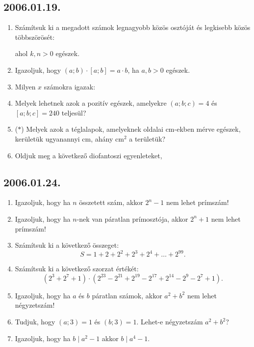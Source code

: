 \subsection*{2006.01.19.}
\begin{enumerate}
\item Számítsuk ki a megadott számok legnagyobb közös osztóját és legkisebb közös többszörösét:
ahol $k,n>0$ egészek.

\item Igazoljuk, hogy $(a;b) \cdot [a;b]=a \cdot b$, ha $a,b>0$ egészek.
\item Milyen $x$ számokra igazak:
\item Melyek lehetnek azok a pozitív egészek, amelyekre $(a;b;c)=4$ és $[a;b;c]=240$ teljesül?
\item ($*$) Melyek azok a téglalapok, amelyeknek oldalai cm-ekben mérve egészek, kerületük ugyanannyi cm, ahány cm$^2$ a területük?
\item Oldjuk meg a következő diofantoszi egyenleteket,
\end{enumerate}

\subsection*{2006.01.24.}
\begin{enumerate}
\item Igazoljuk, hogy ha $n$ összetett szám, akkor 
$2^n-1$ nem lehet prímszám!
\item Igazoljuk, hogy ha $n$-nek van páratlan prímosztója, akkor $2^n+1$ nem lehet prímszám!
\item Számítsuk ki a következő összeget:
$$S=1+2+2^2+2^3+2^4+\ldots+2^{99}.$$
\item Számítsuk ki a következő szorzat értékét:
$$\left(2^3+2^7+1\right)\cdot\left(
2^{23}-2^{21}+2^{19}-2^{17}+2^{14}-2^{9}-2^7+1
\right).$$ 
\item Igazoljuk, hogy ha $a$ és $b$ páratlan számok, akkor $a^2+b^2$ nem lehet négyzetszám!
\item Tudjuk, hogy $(a;3)=1$ és $(b;3)=1$. Lehet-e négyzetszám $a^2+b^2$?
\item Igazoljuk, hogy ha $b\mid a^2-1$ akkor
$b\mid a^4-1$.
\end{enumerate}

